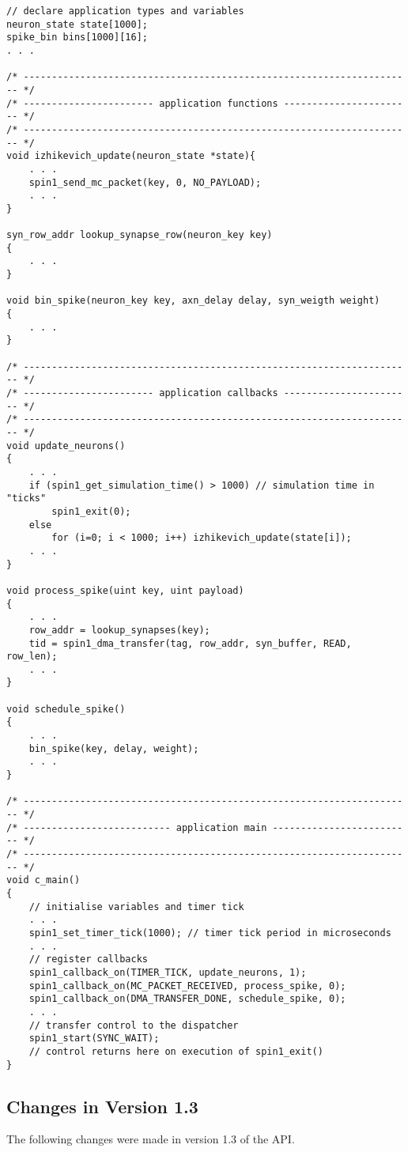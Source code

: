 \documentclass[11pt,a4paper,twoside]{article}
\begin{document}
\begin{lstlisting}
// declare application types and variables
neuron_state state[1000];
spike_bin bins[1000][16];
. . .

/* --------------------------------------------------------------------- */
/* ----------------------- application functions ----------------------- */
/* --------------------------------------------------------------------- */
void izhikevich_update(neuron_state *state){
	. . .
	spin1_send_mc_packet(key, 0, NO_PAYLOAD);
	. . .
}

syn_row_addr lookup_synapse_row(neuron_key key)
{
	. . .
}

void bin_spike(neuron_key key, axn_delay delay, syn_weigth weight)
{
	. . .
}

/* --------------------------------------------------------------------- */
/* ----------------------- application callbacks ----------------------- */
/* --------------------------------------------------------------------- */
void update_neurons()
{
	. . .
	if (spin1_get_simulation_time() > 1000) // simulation time in "ticks"
		spin1_exit(0);
	else
		for (i=0; i < 1000; i++) izhikevich_update(state[i]);
	. . .
}

void process_spike(uint key, uint payload)
{
	. . .
	row_addr = lookup_synapses(key);
	tid = spin1_dma_transfer(tag, row_addr, syn_buffer, READ, row_len);
	. . .
}

void schedule_spike()
{
	. . .
	bin_spike(key, delay, weight);
	. . .
}

/* --------------------------------------------------------------------- */
/* -------------------------- application main ------------------------- */
/* --------------------------------------------------------------------- */
void c_main()
{
	// initialise variables and timer tick
	. . .
	spin1_set_timer_tick(1000); // timer tick period in microseconds
	. . .
	// register callbacks
	spin1_callback_on(TIMER_TICK, update_neurons, 1);
	spin1_callback_on(MC_PACKET_RECEIVED, process_spike, 0);
	spin1_callback_on(DMA_TRANSFER_DONE, schedule_spike, 0);
	. . .
	// transfer control to the dispatcher
	spin1_start(SYNC_WAIT);
	// control returns here on execution of spin1_exit()
}
\end{lstlisting}

\subsection{Changes in Version 1.3}

The following changes were made in version 1.3 of the API.
\end{document}

